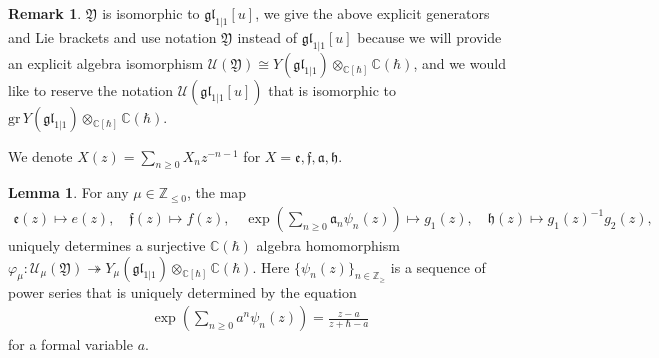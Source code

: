\documentclass[10pt]{amsart}
\theoremstyle{definition}
\newtheorem{Lemma}[Theorem]{Lemma}
\newtheorem{Remark}[Theorem]{Remark}
\numberwithin{equation}{section}
\newcommand{\bC}{\mathbb{C}}
\newcommand{\bZ}{\mathbb{Z}}
\begin{document}
\begin{Remark}
$\mathfrak{Y}$ is isomorphic to $\mathfrak{gl}_{1|1}[u]$, we give the above explicit generators and Lie brackets and use notation $\mathfrak{Y}$ instead of $\mathfrak{gl}_{1|1}[u]$ because we will provide an explicit algebra isomorphism $\mathcal U(\mathfrak{Y})\cong Y(\mathfrak{gl}_{1|1})\otimes_{\bC[\hbar]}\bC(\hbar)$, and we would like to reserve the notation $\mathcal U(\mathfrak{gl}_{1|1}[u])$ that is isomorphic to $\mathrm{gr}\,Y(\mathfrak{gl}_{1|1})\otimes_{\bC[\hbar]}\bC(\hbar)$.
\end{Remark}

We denote $X(z)=\sum_{n\geqslant 0}X_nz^{-n-1}$ for $X=\mathfrak{e},\mathfrak{f},\mathfrak{a},\mathfrak{h}$. 

\begin{Lemma}\label{lem from frak Y to Y(gl(1|1))}
For any $\mu\in \bZ_{\leqslant 0}$, the map 
\begin{align}\label{from frak Y to Y(gl(1|1))}
\mathfrak{e}(z)\mapsto e(z),\quad \mathfrak{f}(z)\mapsto f(z),\quad \exp\left(\sum_{n\geqslant 0}\mathfrak{a}_n\psi_n(z)\right)\mapsto g_1(z),\quad \mathfrak{h}(z)\mapsto g_1(z)^{-1}g_2(z),
\end{align}
uniquely determines a surjective $\bC(\hbar)$ algebra homomorphism $\varphi_\mu\colon \mathcal U_\mu(\mathfrak{Y})\twoheadrightarrow Y_\mu(\mathfrak{gl}_{1|1})\otimes_{\bC[\hbar]}\bC(\hbar)$. Here $\{\psi_n(z)\}_{n\in \bZ_{\geqslant}}$ is a sequence of power series that is uniquely determined by the equation 
\begin{align*}
    \exp\left(\sum_{n\geqslant 0}a^n\psi_n(z)\right)=\frac{z-a}{z+\hbar-a}
\end{align*}
for a formal variable $a$.
\end{Lemma}
\end{document}
